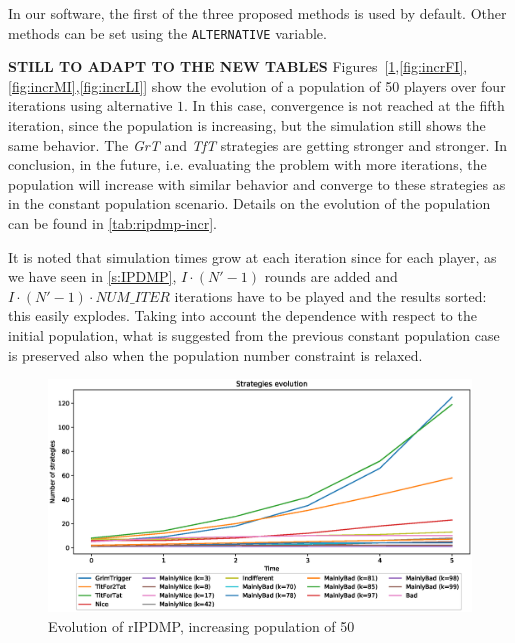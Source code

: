 \documentclass[journal,10pt,twoside]{IEEEtran}
\begin{document}
In our software, the first of the three proposed methods is used by default. Other methods can be set using the \texttt{ALTERNATIVE} variable.

\textbf{STILL TO ADAPT TO THE NEW TABLES}
Figures~[\ref{fig:incrR},\ref{fig:incrFI},\ref{fig:incrMI},\ref{fig:incrLI}] show the evolution of a population of 50 players over four iterations using alternative $1$. In this case, convergence is not reached at the fifth iteration, since the population is increasing, but the simulation still shows the same behavior. The \textit{GrT} and \textit{TfT} strategies are getting stronger and stronger. In conclusion, in the future, i.e. evaluating the problem with more iterations, the population will increase with similar behavior and converge to these strategies as in the constant population scenario. Details on the evolution of the population can be found in \autoref{tab:ripdmp-incr}.

It is noted that simulation times grow at each iteration since for each player, as we have seen in \autoref{s:IPDMP}, $I\cdot(N'-1)$ rounds are added and $I\cdot(N'-1)\cdot{NUM\_ITER}$ iterations have to be played and the results sorted: this easily explodes. Taking into account the dependence with respect to the initial population, what is suggested from the previous constant population case is preserved also when the population number constraint is relaxed.

\begin{figure}[!ht]
    \centering
    \includegraphics[width=1\columnwidth]{../img/ripdmp-incr/alt1/ripdmp-evolution-increasing-pop-50}
    \caption{Evolution of rIPDMP, increasing population of 50}
    \label{fig:incrR}
\end{figure}
\end{document}
